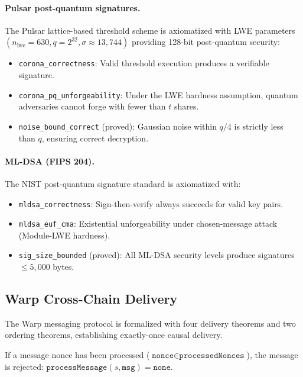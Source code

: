 \paragraph{Pulsar post-quantum signatures.}
The Pulsar lattice-based threshold scheme is axiomatized with LWE parameters
$(n_{\text{lwe}} = 630, q = 2^{32}, \sigma \approx 13{,}744)$ providing 128-bit
post-quantum security:
\begin{itemize}[nosep]
\item \texttt{corona\_correctness}: Valid threshold execution produces a verifiable
signature.
\item \texttt{corona\_pq\_unforgeability}: Under the LWE hardness assumption, quantum
adversaries cannot forge with fewer than $t$ shares.
\item \texttt{noise\_bound\_correct} (proved): Gaussian noise within $q/4$ is strictly
less than $q$, ensuring correct decryption.
\end{itemize}

\paragraph{ML-DSA (FIPS 204).}
The NIST post-quantum signature standard is axiomatized with:
\begin{itemize}[nosep]
\item \texttt{mldsa\_correctness}: Sign-then-verify always succeeds for valid key pairs.
\item \texttt{mldsa\_euf\_cma}: Existential unforgeability under chosen-message attack
(Module-LWE hardness).
\item \texttt{sig\_size\_bounded} (proved): All ML-DSA security levels produce signatures
$\leq 5{,}000$ bytes.
\end{itemize}

\subsection{Warp Cross-Chain Delivery}

The Warp messaging protocol is formalized with four delivery theorems and two
ordering theorems, establishing exactly-once causal delivery.

\begin{theorem}
\label{thm:formal-noreplay}
If a message nonce has been processed ($\texttt{nonce} \in \texttt{processedNonces}$),
the message is rejected: $\texttt{processMessage}(s, \texttt{msg}) = \texttt{none}$.
\end{theorem}

